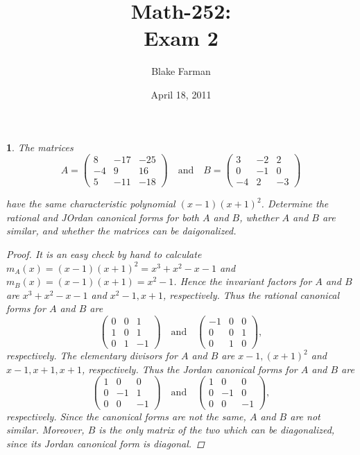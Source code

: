 \documentclass[10pt]{amsart}
\author{Blake Farman}
\title{Math-252:\\Exam 2}
\date{April 18, 2011}
\begin{document}
\maketitle

\newtheorem{thm}{}

\begin{thm}
  \label{Ex1}
  The matrices 
  \[A = \begin{pmatrix}
    8 & -17 & -25\\
    -4 & 9 & 16\\
    5 & -11 & -18
  \end{pmatrix}
  \quad \text{and} \quad
  B= \begin{pmatrix}
    3 & -2 & 2\\
    0 & -1 & 0\\
    -4 & 2 & -3
  \end{pmatrix}\]
  
  have the same characteristic polynomial $(x-1)(x+1)^2$.
  Determine the rational and JOrdan canonical forms for both $A$ and $B$, whether $A$ and $B$ are similar, and whether the matrices can be daigonalized.
  \begin{proof}
    It is an easy check by hand to calculate $m_A(x) = (x-1)(x+1)^2 = x^3 + x^2 - x - 1$ and $m_B(x) = (x-1)(x+1) = x^2 - 1$.
    Hence the invariant factors for $A$ and $B$ are $x^3 + x^2 - x - 1$ and $x^2-1, x+1$, respectively.
    Thus the rational canonical forms for $A$ and $B$ are
    \[\begin{pmatrix}
      0 & 0  & 1\\
      1 & 0 & 1\\
      0 & 1 & -1
    \end{pmatrix}
    \quad \text{and} \quad
    \begin{pmatrix}
      -1 & 0 & 0\\
      0 & 0 & 1\\
      0 & 1 & 0
    \end{pmatrix},\]
    respectively.
    The elementary divisors for $A$ and $B$ are $x-1,(x+1)^2$ and $x-1, x+1, x+1$, respectively.
    Thus the Jordan canonical forms for $A$ and $B$ are 
    \[\begin{pmatrix}
      1 & 0 & 0\\
      0 & -1 & 1\\
      0 & 0 & -1
    \end{pmatrix}
    \quad \text{and} \quad
    \begin{pmatrix}
      1 & 0 & 0\\
      0 & -1 & 0\\
      0 & 0 & -1
    \end{pmatrix},\]
    respectively.
    Since the canonical forms are not the same, $A$ and $B$ are not similar.
    Moreover, $B$ is the only matrix of the two which can be diagonalized, since its Jordan canonical form is diagonal.
  \end{proof}
\end{thm}
\end{document}
